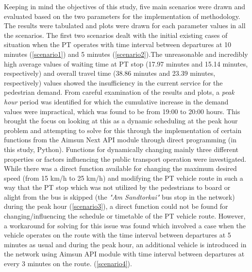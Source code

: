 Keeping in mind the objectives of this study, five main scenarios were drawn and evaluated based on the two parameters for the implementation of methodology. The results were tabulated and plots were drawn for each parameter values in all the scenarios. The first two scenarios dealt with the initial existing cases of situation when the PT operates with time interval between departures at 10 minutes (\ref{scenario1}) and 5 minutes (\ref{scenario2}).The unreasonable and incredibly high average values of waiting time at PT stop (17.97 minutes and 15.14 minutes, respectively) and overall travel time (38.86 minutes and 23.39 minutes, respectively) values showed the insufficiency in the current service for the pedestrian demand. From careful examination of the results and plots, a \textit{peak hour} period was identified for which the cumulative increase in the demand values were impractical, which was found to be from 19:00 to 20:00 hours. This brought the focus on looking at this as a dynamic scheduling at the peak hour problem and attempting to solve for this through the implementation of certain functions from the Aimsun Next API module through direct programming (in this study, Python). Functions for dynamically changing mainly three different properties or factors influencing the public transport operation were investigated. While there was a direct function available for changing the maximum desired speed (from 15 km/h to 25 km/h) and modifying the PT vehicle route in such a way that the PT stop which was not utilized by the pedestrians to board or alight from the bus is skipped (the \textit{"Am Sandtorkai"} bus stop in the network) during the peak hour (\ref{scenario3}), a direct function could not be found for changing/influencing the schedule or timetable of the PT vehicle route. However, a workaround for solving for this issue was found which involved a case when the vehicle operates on the route with the time interval between departures at 5 minutes as usual and during the peak hour, an additional vehicle is introduced in the network using Aimsun API module with time interval between departures at every 3 minutes on the route. (\ref{scenario4}).

